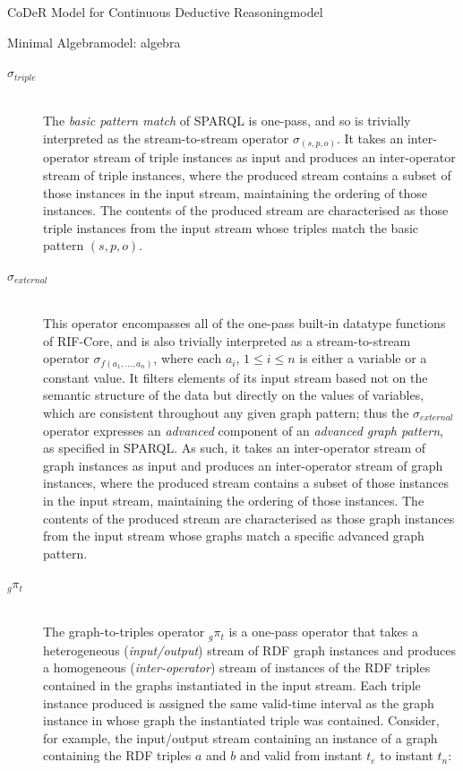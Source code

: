\begin{nestedsection}{CoDeR Model for Continuous Deductive Reasoning}{model}
\begin{nestedsection}{Minimal Algebra}{model: algebra}
		\begin{description}
			\item[$\sigma_{triple}$] \hfill \\
				The \emph{basic pattern match} of SPARQL is one-pass, and so is trivially interpreted as the stream-to-stream operator $\sigma_{(s,p,o)}$.
				It takes an inter-operator stream of triple instances as input and produces an inter-operator stream of triple instances, where the produced stream contains a subset of those instances in the input stream, maintaining the ordering of those instances.
				The contents of the produced stream are characterised as those triple instances from the input stream whose triples match the basic pattern ${(s,p,o)}$.
			\item[$\sigma_{external}$] \hfill \\
				This operator encompasses all of the one-pass built-in datatype functions of RIF-Core, and is also trivially interpreted as a stream-to-stream operator $\sigma_{f(a_1,\dots,a_n)}$, where each $a_i$, ${1 \leq i \leq n}$ is either a variable or a constant value.
				It filters elements of its input stream based not on the semantic structure of the data but directly on the values of variables, which are consistent throughout any given graph pattern;
				thus the $\sigma_{external}$ operator expresses an \emph{advanced} component of an \emph{advanced graph pattern}, as specified in SPARQL.
				As such, it takes an inter-operator stream of graph instances as input and produces an inter-operator stream of graph instances, where the produced stream contains a subset of those instances in the input stream, maintaining the ordering of those instances.
				The contents of the produced stream are characterised as those graph instances from the input stream whose graphs match a specific advanced graph pattern.
			\item[${{}_g\pi_t}$] \hfill \\
				The graph-to-triples operator ${{}_g\pi_t}$ is a one-pass operator that takes a heterogeneous (\emph{input/output}) stream of RDF graph instances and produces a homogeneous (\emph{inter-operator}) stream of instances of the RDF triples contained in the graphs instantiated in the input stream.
				Each triple instance produced is assigned the same valid-time interval as the graph instance in whose graph the instantiated triple was contained.
				Consider, for example, the input/output stream containing an instance of a graph containing the RDF triples $a$ and $b$ and valid from instant $t_e$ to instant $t_n$:

\end{description}
\end{nestedsection}
\end{nestedsection}
